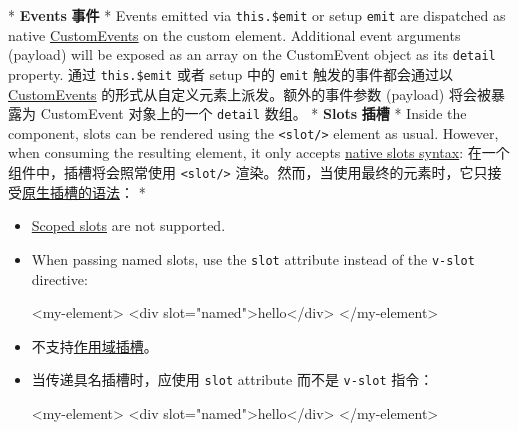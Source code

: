 \begin{paracol}{2} 
 
\switchcolumn[0]*%
\textbf{Events}
\switchcolumn
\textbf{事件}
\switchcolumn[0]*%
Events emitted via \texttt{this.\$emit} or setup \texttt{emit} are
dispatched as native
\href{https://developer.mozilla.org/en-US/docs/Web/Events/Creating_and_triggering_events\#adding_custom_data_–_customevent}{CustomEvents}
on the custom element. Additional event arguments (payload) will be
exposed as an array on the CustomEvent object as its \texttt{detail}
property.
\switchcolumn
通过 \texttt{this.\$emit} 或者 setup 中的 \texttt{emit}
触发的事件都会通过以
\href{https://developer.mozilla.org/en-US/docs/Web/Events/Creating_and_triggering_events\#adding_custom_data_–_customevent}{CustomEvents}
的形式从自定义元素上派发。额外的事件参数 (payload) 将会被暴露为
CustomEvent 对象上的一个 \texttt{detail} 数组。
\switchcolumn[0]*%
\textbf{Slots}
\switchcolumn
\textbf{插槽}
\switchcolumn[0]*%
Inside the component, slots can be rendered using the
\texttt{\textless{}slot/\textgreater{}} element as usual. However, when
consuming the resulting element, it only accepts
\href{https://developer.mozilla.org/en-US/docs/Web/Web_Components/Using_templates_and_slots}{native
slots syntax}:
\switchcolumn
在一个组件中，插槽将会照常使用 \texttt{\textless{}slot/\textgreater{}}
渲染。然而，当使用最终的元素时，它只接受\href{https://developer.mozilla.org/en-US/docs/Web/Web_Components/Using_templates_and_slots}{原生插槽的语法}：
\switchcolumn[0]*%
\begin{itemize}
\item
  \href{https://vuejs.org/guide/components/slots.html\#scoped-slots}{Scoped
  slots} are not supported.
\item
  When passing named slots, use the \texttt{slot} attribute instead of
  the \texttt{v-slot} directive:
\begin{codeHtml}
<my-element>
  <div slot="named">hello</div>
</my-element>
\end{codeHtml}
\end{itemize}
\switchcolumn
\begin{itemize}
\item
  不支持\href{https://cn.vuejs.org/guide/components/slots.html\#scoped-slots}{作用域插槽}。
\item
  当传递具名插槽时，应使用 \texttt{slot} attribute 而不是
  \texttt{v-slot} 指令：
\begin{codeHtml}
<my-element>
  <div slot="named">hello</div>
</my-element>

\end{codeHtml}
\end{itemize}
\end{paracol}
